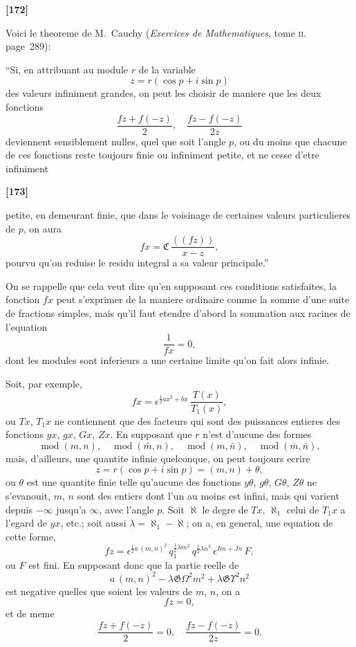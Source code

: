 \documentclass[11pt,a4paper]{article}
\DeclareMathOperator{\modd}{mod}
\begin{document}
\textbf{[172]}

Voici le theoreme de M.~Cauchy (\textit{Exercices de Mathematiques}, tome \textsc{ii}. page~289):

``Si, en attribuant au module $r$ de la variable
\[z = r(\cos p + i\sin p)\]
des valeurs infiniment grandes, on peut les choisir de maniere que les deux fonctions
\[\frac{fz + f(-z)}{2},\quad \frac{fz - f(-z)}{2z}\]
deviennent sensiblement nulles, quel que soit l'angle $p$, ou du moins que chacune de
ces fonctions reste toujours finie ou infiniment petite, et ne cesse d'etre infiniment

\textbf{[173]}

petite, en demeurant finie, que dans le voisinage de certaines valeurs particulieres de $p$,
on aura
\[fx = \boldsymbol{\mathfrak{C}}\, \frac{((fz))}{x - z},\]
pourvu qu'on reduise le residu integral a sa valeur principale.''

On se rappelle que cela veut dire qu'en supposant ces conditions satisfaites, la
fonction $fx$ peut s'exprimer de la maniere ordinaire comme la somme d'une suite de
fractions simples, mais qu'il faut etendre d'abord la sommation aux racines de l'equation
\[\frac{1}{fx} = 0,\]
dont les modules sont inferieurs a une certaine limite qu'on fait alors infinie.

Soit, par exemple,
\begin{equation}
fx = \epsilon^{\frac{1}{2}ax^2 + bx}\, \frac{T(x)}{T_1(x)}, \tag{33}
\end{equation}
ou $Tx$, $T_1x$ ne contiennent que des facteurs qui sont des puissances entieres des
fonctions $yx$, $gx$, $Gx$, $Zx$. En supposant que $r$ n'est d'aucune des formes
\[\modd(m, n),\quad \modd(\bar{m}, n),\quad \modd(m, \bar{n}),\quad \modd(\bar{m}, \bar{n}),\]
mais, d'ailleurs, une quantite infinie quelconque, on peut toujours ecrire
\begin{equation}
z = r(\cos p + i\sin p) = (m, n) + \theta, \tag{34}
\end{equation}
ou $\theta$ est une quantite finie telle qu'aucune des fonctions $y\theta$, $g\theta$, $G\theta$, $Z\theta$ ne s'evanouit,
$m$, $n$ sont des entiers dont l'un au moins est infini, mais qui varient depuis $-\infty$
jusqu'a $\infty$, avec l'angle $p$. Soit $\aleph$ le degre de $Tx$, $\aleph_1$ celui de $T_1x$ a l'egard de $yx$,
etc.; soit aussi $\lambda = \aleph_1 - \aleph$; on a, en general, une equation de cette forme,
\begin{equation}
fz = \epsilon^{\frac{1}{2}a\, (m, n)^2}\, q_1^{\frac{1}{2}\lambda m^2}\, q^{\frac{1}{2}\lambda n^2}\, \epsilon^{Im + Jn}\, F, \tag{35}
\end{equation}
ou $F$ est fini. En supposant donc que la partie reelle de
\begin{equation}
a\, (m, n)^2 - \lambda\mathfrak{G}\Omega^2 m^2 + \lambda\mathfrak{G}\Upsilon^2 n^2 \tag{36}
\end{equation}
est negative quelles que soient les valeurs de $m$, $n$, on a
\[fz = 0,\]
et de meme
\[\frac{fz + f(-z)}{2} = 0,\quad \frac{fz - f(-z)}{2z} = 0.\]
\end{document}
